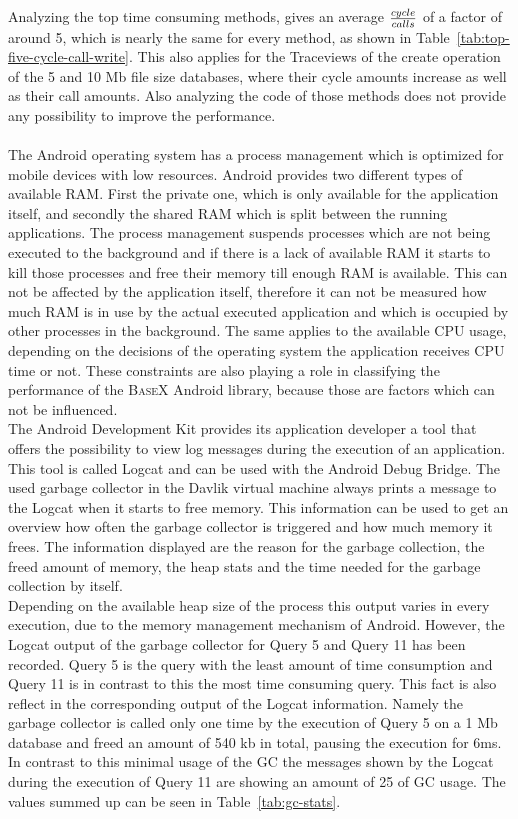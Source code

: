 Analyzing the top time consuming methods, gives an average ${cycle \over calls}$ of a factor of around 5, which is nearly the same for every method, as shown in Table~\ref{tab:top-five-cycle-call-write}.
This also applies for the Traceviews of the create operation of the 5 and 10 Mb file size databases, where their cycle amounts increase as well as their call amounts.
Also analyzing the code of those methods does not provide any possibility to improve the performance.\\
\\
The Android operating system has a process management which is optimized for mobile devices with low resources.
Android provides two different types of available RAM. 
First the private one, which is only available for the application itself, and secondly the shared RAM which is split between the running applications.
The process management suspends processes which are not being executed to the background and if there is a lack of available RAM it starts to kill those processes and free their memory till enough RAM is available.
This can not be affected by the application itself, therefore it can not be measured how much RAM is in use by the actual executed application and which is occupied by other processes in the background.
The same applies to the available CPU usage, depending on the decisions of the operating system the application receives CPU time or not.
These constraints are also playing a role in classifying the performance of the \textsc{BaseX} Android library, because those are factors which can not be influenced.\\
The Android Development Kit provides its application developer a tool that offers the possibility to view log messages during the execution of an application.
This tool is called Logcat and can be used with the Android Debug Bridge.
The used garbage collector in the Davlik virtual machine always prints a message to the Logcat when it starts to free memory.
This information can be used to get an overview how often the garbage collector is triggered and how much memory it frees.
The information displayed are the reason for the garbage collection, the freed amount of memory, the heap stats and the time needed for the garbage collection by itself.\\
Depending on the available heap size of the process this output varies in every execution, due to the memory management mechanism of Android.
However, the Logcat output of the garbage collector for Query 5 and Query 11 has been recorded.
Query 5 is the query with the least amount of time consumption and Query 11 is in contrast to this the most time consuming query.
This fact is also reflect in the corresponding output of the Logcat information.
Namely the garbage collector is called only one time by the execution of Query 5 on a 1 Mb database and freed an amount of 540 kb in total, pausing the execution for 6ms.
In contrast to this minimal usage of the GC the messages shown by the Logcat during the execution of Query 11 are showing an amount of 25 of GC usage.
The values summed up can be seen in Table~\ref{tab:gc-stats}.

